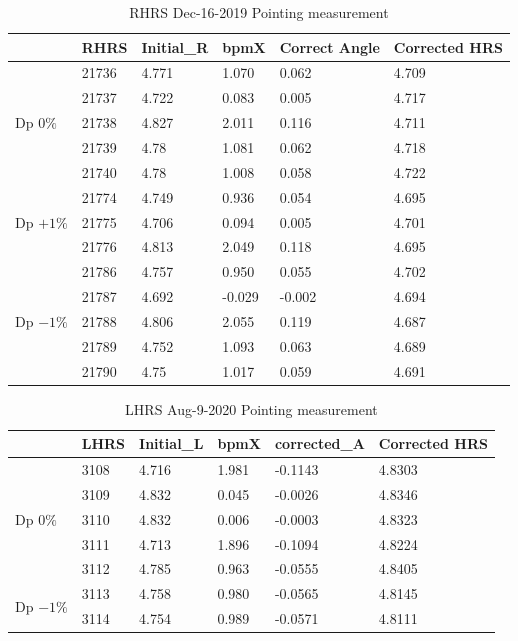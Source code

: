 \begin{table}[!ht]
    \caption{RHRS Dec-16-2019 Pointing measurement}
    \centering

    \begin{tabular}{|l|l|l|l|l|l|}
    \hline
        ~ & RHRS & Initial\_R & bpmX & Correct Angle & Corrected HRS \\ \hline
        \multirow{5}{5em}{Dp $0\%$} & 21736 & 4.771 & 1.070 & 0.062 & 4.709 \\
        ~ & 21737 & 4.722 & 0.083 & 0.005 & 4.717 \\
        ~ & 21738 & 4.827 & 2.011 & 0.116 & 4.711 \\
        ~ & 21739 & 4.78 & 1.081 & 0.062 & 4.718 \\
        ~ & 21740 & 4.78 & 1.008 & 0.058 & 4.722 \\ \hline
        \multirow{3}{5em}{ Dp $+1\%$} & 21774 & 4.749 & 0.936 & 0.054 & 4.695 \\
        ~ & 21775 & 4.706 & 0.094 & 0.005 & 4.701 \\
        ~ & 21776 & 4.813 & 2.049 & 0.118 & 4.695 \\ \hline
        \multirow{5}{5em}{ Dp $-1\%$} & 21786 & 4.757 & 0.950 & 0.055 & 4.702 \\ 
        ~ & 21787 & 4.692 & -0.029 & -0.002 & 4.694 \\ 
        ~ & 21788 & 4.806 & 2.055 & 0.119 & 4.687 \\
        ~ & 21789 & 4.752 & 1.093 & 0.063 & 4.689 \\ 
        ~ & 21790 & 4.75 & 1.017 & 0.059 & 4.691 \\ \hline
    \end{tabular}
    \label{table:crex_1_pointing_lhrs}
\end{table}


\begin{table}[!ht]
    \caption{LHRS Aug-9-2020 Pointing measurement}
    \centering
    \begin{tabular}{|l|l|l|l|l|l|}
    \hline
        ~ & LHRS & Initial\_L & bpmX & corrected\_A & Corrected HRS \\ \hline
        \multirow{5}{5em}{Dp $0\%$} & 3108 & 4.716 & 1.981 & -0.1143 & 4.8303 \\  
        ~ & 3109 & 4.832 & 0.045 & -0.0026 & 4.8346 \\ 
        ~ & 3110 & 4.832 & 0.006 & -0.0003 & 4.8323 \\  
        ~ & 3111 & 4.713 & 1.896 & -0.1094 & 4.8224 \\  
        ~ & 3112 & 4.785 & 0.963 & -0.0555 & 4.8405 \\  \hline
        \multirow{2}{5em}{Dp $-1\%$} & 3113 & 4.758 & 0.980 & -0.0565 & 4.8145 \\ 
        ~ & 3114 & 4.754 & 0.989 & -0.0571 & 4.8111 \\ \hline
    \end{tabular}
    \label{table:crex_2_pointing_lhrs}
\end{table}

